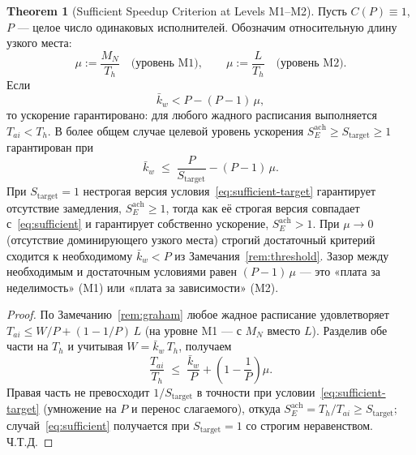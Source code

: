 \documentclass[12pt,a4paper]{article}
\theoremstyle{definition}
\newtheorem{theorem}{Theorem}
\begin{document}
\begin{theorem}[Sufficient Speedup Criterion at Levels M1--M2]\label{thm:sufficient}
Пусть $C(P) \equiv 1$, $P$ --- целое число одинаковых исполнителей. Обозначим относительную длину узкого места:
\[
  \mu := \frac{M_N}{T_h} \quad \text{(уровень M1)}, \qquad \mu := \frac{L}{T_h} \quad \text{(уровень M2)}.
\]
Если
\begin{equation}\label{eq:sufficient}
  \bar{k}_w < P - (P - 1)\, \mu,
\end{equation}
то ускорение гарантировано: для любого жадного расписания выполняется $T_{ai} < T_h$. В более общем случае целевой уровень ускорения $S_E^{\text{ach}} \ge S_{\text{target}} \ge 1$ гарантирован при
\begin{equation}\label{eq:sufficient-target}
  \bar{k}_w \;\le\; \frac{P}{S_{\text{target}}} - (P - 1)\, \mu.
\end{equation}
При $S_{\text{target}} = 1$ нестрогая версия условия~\eqref{eq:sufficient-target}
гарантирует отсутствие замедления, $S_E^{\mathrm{ach}}\ge1$, тогда как её
строгая версия совпадает с~\eqref{eq:sufficient} и гарантирует собственно
ускорение, $S_E^{\mathrm{ach}}>1$. При $\mu \to 0$ (отсутствие доминирующего
узкого места) строгий достаточный критерий сходится к необходимому
$\bar{k}_w < P$ из Замечания~\ref{rem:threshold}. Зазор между необходимым и
достаточным условиями равен $(P-1)\,\mu$ --- это «плата за неделимость» (M1)
или «плата за зависимости» (M2).
\end{theorem}

\begin{proof}
По Замечанию~\ref{rem:graham} любое жадное расписание удовлетворяет $T_{ai} \le W/P + (1 - 1/P)\,L$ (на уровне M1 --- с $M_N$ вместо $L$). Разделив обе части на $T_h$ и учитывая $W = \bar{k}_w\,T_h$, получаем
\[
  \frac{T_{ai}}{T_h} \;\le\; \frac{\bar{k}_w}{P} + \left(1 - \frac{1}{P}\right) \mu.
\]
Правая часть не превосходит $1/S_{\text{target}}$ в точности при условии~\eqref{eq:sufficient-target} (умножение на $P$ и перенос слагаемого), откуда $S_E^{\text{ach}} = T_h/T_{ai} \ge S_{\text{target}}$; случай~\eqref{eq:sufficient} получается при $S_{\text{target}} = 1$ со строгим неравенством. Ч.Т.Д.
\end{proof}
\end{document}
